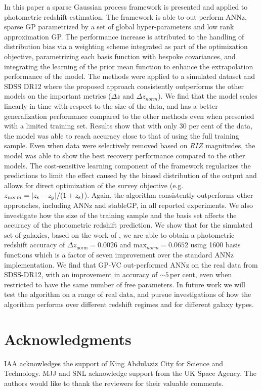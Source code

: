 \documentclass[useAMS,usenatbib,fleqn]{mn2e}
\begin{document}
In this paper a sparse Gaussian process framework is presented and applied to photometric redshift estimation. The framework is able to out perform ANNz, sparse GP parametrized by a set of global hyper-parameters and low rank approximation GP. The performance increase is attributed to the handling of distribution bias via a weighting scheme integrated as part of the optimization objective, parametrizing each basis function with bespoke covariances, and integrating the learning of the prior mean function to enhance the extrapolation performance of the model. The methods were applied to a simulated dataset and SDSS DR12 where the proposed approach consistently outperforms the other models on the important metrics ($\Delta z$ and $\Delta z_{norm}$). We find that the model scales linearly in time with respect to the size of the data, and has a better generalization performance compared to the other methods even when presented with a limited training set. Results show that with only 30 per cent of the data, the model was able to reach accuracy close to that of using the full training sample. Even when data were selectively removed based on $RIZ$ magnitudes, the model was able to show the best recovery performance compared to the other models. The cost-sensitive learning component of the framework regularizes the predictions to limit the effect caused by the biased distribution of the output and allows for direct optimization of the survey objective (e.g. $z_{norm} = |z_\textrm{s} - z_\textrm{p}| / (1+z_{\rm s})$). Again, the algorithm consistently outperforms other approaches, including {\sc ANNz} and {\sc stableGP}, in all reported experiments. We also investigate how the size of the training sample and the basis set affects the accuracy of the photometric redshift prediction. We show that for the simulated set of galaxies, based on the work of \citet{jouvel09}, we are able to obtain a photometric redshift accuracy of $\Delta z_\textrm{norm} = 0.0026$ and $\mbox{max}_{norm}=0.0652$ using 1600 basis functions which is a factor of seven improvement over the standard {\sc ANNz} implementation. We find that GP-VC out-performed {\sc ANNz} on the real data from SDSS-DR12, with an improvement in accuracy of $\sim 5$\,per cent, even when restricted to have the same number of free parameters. In future work we will test the algorithm on a range of real data, and pursue investigations of how the algorithm performs over different redshift regimes and for different galaxy types. 




\section*{Acknowledgments}
IAA acknowledges the support of King Abdulaziz City for Science and Technology.
MJJ and SNL acknowledge support from the UK Space Agency. The authors would like to thank the reviewers for their valuable comments.
\balance
\footnotesize{


}

\label{lastpage}
\end{document}
